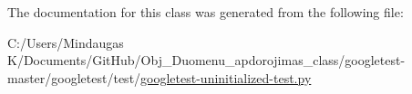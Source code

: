 The documentation for this class was generated from the following file\+:\begin{DoxyCompactItemize}
\item 
C\+:/\+Users/\+Mindaugas K/\+Documents/\+Git\+Hub/\+Obj\+\_\+\+Duomenu\+\_\+apdorojimas\+\_\+class/googletest-\/master/googletest/test/\mbox{\hyperlink{googletest-master_2googletest_2test_2googletest-uninitialized-test_8py}{googletest-\/uninitialized-\/test.\+py}}\end{DoxyCompactItemize}
